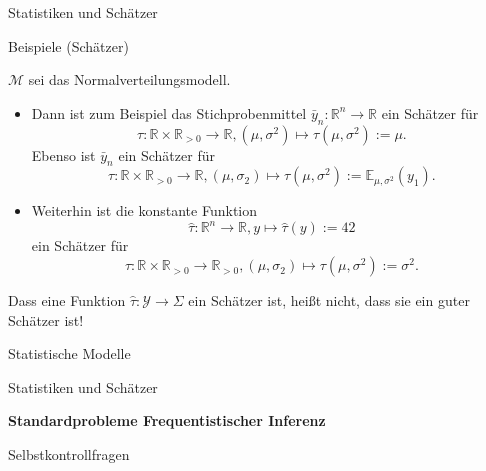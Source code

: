 \documentclass[
  8pt,
  ignorenonframetext,
]{beamer}
\providecommand{\tightlist}{%
  \setlength{\itemsep}{0pt}\setlength{\parskip}{0pt}}
\begin{document}
\begin{frame}{Statistiken und Schätzer}
\protect\hypertarget{statistiken-und-schuxe4tzer-3}{}
\small

Beispiele (Schätzer)

\(\mathcal{M}\) sei das Normalverteilungsmodell.

\begin{itemize}
\tightlist
\item
  Dann ist zum Beispiel das Stichprobenmittel
  \(\bar{y}_n : \mathbb{R}^n \to \mathbb{R}\) ein Schätzer für
  \begin{equation}
  \tau : \mathbb{R} \times \mathbb{R}_{>0} \to \mathbb{R},
  (\mu, \sigma^2) \mapsto \tau(\mu,\sigma^2) := \mu.
  \end{equation} Ebenso ist \(\bar{y}_n\) ein Schätzer für
  \begin{equation}
  \tau: \mathbb{R} \times \mathbb{R}_{>0} \to \mathbb{R},
  (\mu, \sigma_2) \mapsto \tau(\mu,\sigma^2) := \mathbb{E}_{\mu,\sigma^2}(y_1).
  \end{equation}
\item
  Weiterhin ist die konstante Funktion \begin{equation}
  \hat{\tau} : \mathbb{R}^n \to \mathbb{R}, y \mapsto \hat{\tau}(y) := 42
  \end{equation} ein Schätzer für \begin{equation}
  \tau : \mathbb{R} \times \mathbb{R}_{>0} \to \mathbb{R}_{>0},
  (\mu, \sigma_2) \mapsto \tau(\mu,\sigma^2) := \sigma^2.
  \end{equation}
\end{itemize}

Dass eine Funktion \(\hat{\tau} : \mathcal{Y} \to \Sigma\) ein Schätzer
ist, heißt nicht, dass sie ein guter Schätzer ist!
\end{frame}

\begin{frame}{}
\protect\hypertarget{section-7}{}
\large
{}
\vfill

Statistische Modelle

Statistiken und Schätzer

\textbf{Standardprobleme Frequentistischer Inferenz}

Selbstkontrollfragen \vfill
\end{frame}
\end{document}
